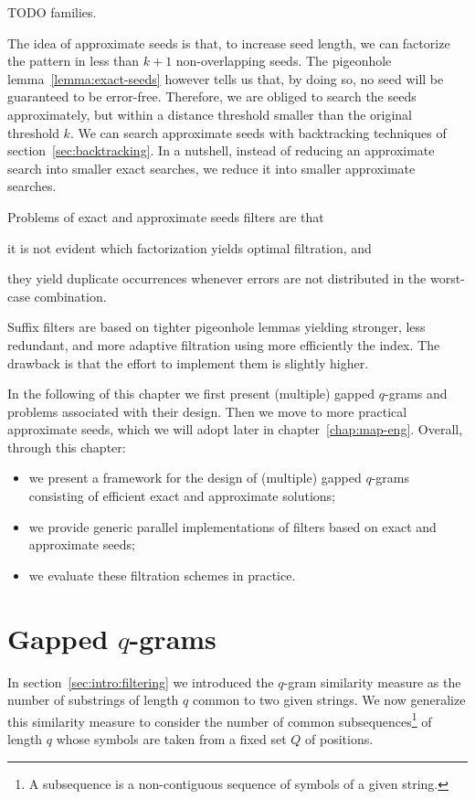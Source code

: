 TODO families.

The idea of approximate seeds is that, to increase seed length, we can factorize the pattern in less than $k+1$ non-overlapping seeds.
The pigeonhole lemma~\ref{lemma:exact-seeds} however tells us that, by doing so, no seed will be guaranteed to be error-free.
Therefore, we are obliged to search the seeds approximately, but within a distance threshold smaller than the original threshold $k$.
We can search approximate seeds with backtracking techniques of section~\ref{sec:backtracking}.
In a nutshell, instead of reducing an approximate search into smaller exact searches, we reduce it into smaller approximate searches.

Problems of exact and approximate seeds filters are that
\begin{inparaenum}[(i)]
\item it is not evident which factorization yields optimal filtration, and
\item they yield duplicate occurrences whenever errors are not distributed in the worst-case combination.
\end{inparaenum}
Suffix filters are based on tighter pigeonhole lemmas yielding stronger, less redundant, and more adaptive filtration using more efficiently the index.
The drawback is that the effort to implement them is slightly higher.

In the following of this chapter we first present (multiple) gapped $q$-grams and problems associated with their design.
Then we move to more practical approximate seeds, which we will adopt later in chapter~\ref{chap:map-eng}.
Overall, through this chapter:
\begin{itemize}
\item we present a framework for the design of (multiple) gapped $q$-grams consisting of efficient exact and approximate solutions;
\item we provide generic parallel implementations of filters based on exact and approximate seeds;
\item we evaluate these filtration schemes in practice.
\end{itemize}

\section{Gapped $q$-grams}

In section~\ref{sec:intro:filtering} we introduced the $q$-gram similarity measure as the number of substrings of length $q$ common to two given strings.
We now generalize this similarity measure to consider the number of common subsequences\footnote{A subsequence is a non-contiguous sequence of symbols of a given string.} of length $q$ whose symbols are taken from a fixed set $Q$ of positions.


